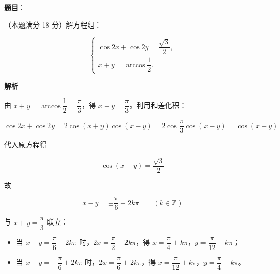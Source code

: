\begin{answer}

\textbf{题目}：

（本题满分 18 分）解方程组：

\nopagebreak[4]
\[
\begin{cases}
\cos 2x+\cos 2y=\dfrac{\sqrt3}{2},\\[2pt]
x+y=\arccos\dfrac12.
\end{cases}
\]

\textbf{解析}

由 $x+y=\arccos\dfrac12=\dfrac\pi3$，得 $x+y=\dfrac\pi3$。利用和差化积：

\nopagebreak[4]
\[
\cos2x+\cos2y=2\cos(x+y)\cos(x-y)
=2\cos\frac\pi3\cos(x-y)=\cos(x-y)
\]

代入原方程得

\nopagebreak[4]
\[
\cos(x-y)=\frac{\sqrt3}{2}
\]

故

\nopagebreak[4]
\[
x-y=\pm\frac\pi6+2k\pi\qquad(k\in\mathbb Z)
\]

与 $x+y=\dfrac\pi3$ 联立：

\begin{itemize}
\item 当 $x-y=\dfrac\pi6+2k\pi$ 时，$2x=\dfrac\pi2+2k\pi$，得 $x=\dfrac\pi4+k\pi$，$y=\dfrac\pi{12}-k\pi$；
\item 当 $x-y=-\dfrac\pi6+2k\pi$ 时，$2x=\dfrac\pi6+2k\pi$，得 $x=\dfrac\pi{12}+k\pi$，$y=\dfrac\pi4-k\pi$。
\end{itemize}


\end{answer}
